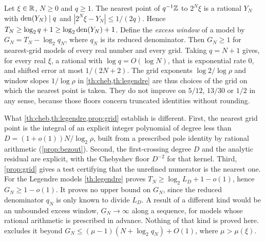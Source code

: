 \documentclass[11pt]{article}
\begin{document}
\begin{remark}\label{rem:benchmark}
Let $\xi\in\mathbb R$, $N\ge0$ and $q\ge1$. The nearest point of $q^{-1}\mathbb Z$ to $2^N\xi$ is a rational $Y_N$ with $\operatorname{den}(Y_N)\mid q$ and $|2^N\xi-Y_N|\le1/(2q)$. Hence $T_N\ge\log_2q+1\ge\log_2\operatorname{den}(Y_N)+1$. Define the \emph{excess window} of a model by $G_N=T_N-\log_2q_N$, where $q_N$ is its reduced denominator. Then $G_N\ge1$ for nearest-grid models of every real number and every grid. Taking $q=N+1$ gives, for every real $\xi$, a rational with $\log q=O(\log N)$, that is exponential rate $0$, and shifted error at most $1/(2N+2)$. The grid exponents $\log2/\log\rho$ and window slopes $1/\log\rho$ in \cref{th:cheb,th:legendre} are thus choices of the grid on which the nearest point is taken. They do not improve on $5/12$, $13/30$ or $1/2$ in any sense, because those floors concern truncated identities without rounding.

What \cref{th:cheb,th:legendre,prop:grid} establish is different. First, the nearest grid point is the integral of an explicit integer polynomial of degree less than $D=(1+o(1))N/\log_2\rho$, built from a prescribed pole identity by rational arithmetic (\cref{prop:bezout}). Second, the first-crossing degree $D$ and the analytic residual are explicit, with the Chebyshev floor $D^{-2}$ for that kernel. Third, \cref{prop:grid} gives a test certifying that the unrefined numerator is the nearest one. For the Legendre models \cref{th:legendre} proves $T_N\ge\log_2L_D+1-o(1)$, hence $G_N\ge1-o(1)$. It proves no upper bound on $G_N$, since the reduced denominator $q_N$ is only known to divide $L_D$. A result of a different kind would be an unbounded excess window, $G_N\to\infty$ along a sequence, for models whose rational arithmetic is prescribed in advance. Nothing of that kind is proved here.  excludes it beyond $G_N\le(\mu-1)(N+\log_2q_N)+O(1)$, where $\mu>\mu(\xi)$.
\end{remark}
\end{document}
